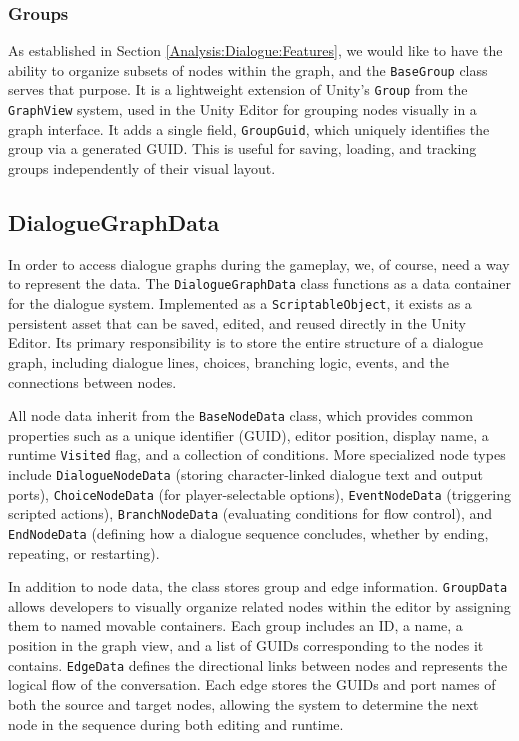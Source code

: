 \subsubsection{Groups}
As established in Section \ref{Analysis:Dialogue:Features}, we would like to have the ability to organize subsets of nodes within the graph, and the \verb|BaseGroup| class serves that purpose. It is a lightweight extension of Unity’s \verb|Group| from the \verb|GraphView| system, used in the Unity Editor for grouping nodes visually in a graph interface. It adds a single field, \verb|GroupGuid|, which uniquely identifies the group via a generated GUID. This is useful for saving, loading, and tracking groups independently of their visual layout.


\subsection{DialogueGraphData}
In order to access dialogue graphs during the gameplay, we, of course, need a way to represent the data. The \verb|DialogueGraphData| class functions as a data container for the dialogue system. Implemented as a \verb|ScriptableObject|, it exists as a persistent asset that can be saved, edited, and reused directly in the Unity Editor. Its primary responsibility is to store the entire structure of a dialogue graph, including dialogue lines, choices, branching logic, events, and the connections between nodes.

All node data inherit from the \verb|BaseNodeData| class, which provides common properties such as a unique identifier (GUID), editor position, display name, a runtime \verb|Visited| flag, and a collection of conditions. More specialized node types include \verb|DialogueNodeData| (storing character-linked dialogue text and output ports), \verb|ChoiceNodeData| (for player-selectable options), \verb|EventNodeData| (triggering scripted actions), \verb|BranchNodeData| (evaluating conditions for flow control), and \verb|EndNodeData| (defining how a dialogue sequence concludes, whether by ending, repeating, or restarting).

In addition to node data, the class stores group and edge information. \verb|GroupData| allows developers to visually organize related nodes within the editor by assigning them to named movable containers. Each group includes an ID, a name, a position in the graph view, and a list of GUIDs corresponding to the nodes it contains. \verb|EdgeData| defines the directional links between nodes and represents the logical flow of the conversation. Each edge stores the GUIDs and port names of both the source and target nodes, allowing the system to determine the next node in the sequence during both editing and runtime.


